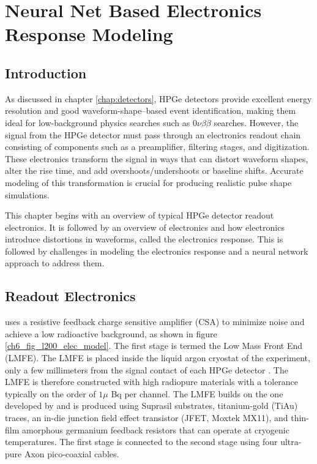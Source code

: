 \chapter{Neural Net Based Electronics Response Modeling}
\label{chap:elect_resp}

\section{Introduction}
As discussed in chapter \ref{chap:detectors}, HPGe detectors provide excellent energy resolution and good waveform-shape–based event identification, making them ideal for low-background physics searches such as $0\nu\beta\beta$ searches. However, the signal from the HPGe detector must pass through an electronics readout chain consisting of components such as a preamplifier, filtering stages, and digitization. These electronics transform the signal in ways that can distort waveform shapes, alter the rise time, and add overshoots/undershoots or baseline shifts. Accurate modeling of this transformation is crucial for producing realistic pulse shape simulations.

This chapter begins with an overview of typical HPGe detector readout electronics. It is followed by an overview of {\Ltwo}  electronics and how electronics introduce distortions in waveforms, called the electronics response. This is followed by challenges in modeling the electronics response and a neural network approach to address them.

\section{{\Ltwo} Readout Electronics}
{\Ltwo} uses a resistive feedback charge sensitive amplifier (CSA) to minimize noise and achieve a low radioactive background, as shown in figure \ref{ch6_fig_l200_elec_model}. The first stage is termed the Low Mass Front End (LMFE). The LMFE is placed inside the liquid argon cryostat of the experiment, only a few millimeters from the signal contact of each HPGe detector \cite{Willers_2020}. The LMFE is therefore constructed with high radiopure materials with a tolerance typically on the order of $1\mu$ Bq per channel. The LMFE builds on the one developed by {\MJ} and is produced using Suprasil substrates, titanium-gold (TiAu) traces, an in-die junction field effect transistor (JFET, Moxtek MX11), and thin-film amorphous germanium feedback resistors that can operate at cryogenic temperatures. The first stage is connected to the second stage using four ultra-pure Axon pico-coaxial cables.

